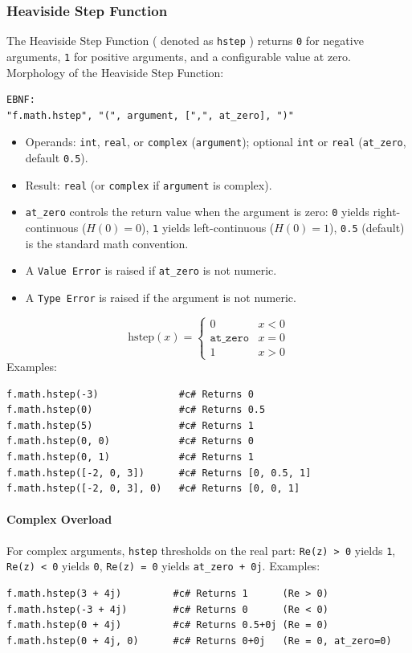 \subsubsection{Heaviside Step Function}
The Heaviside Step Function ( denoted as \texttt{hstep} ) returns \texttt{0} for negative arguments, \texttt{1} for positive arguments, and a configurable value at zero. \\
Morphology of the Heaviside Step Function:
\begin{verbatim}
EBNF:
"f.math.hstep", "(", argument, [",", at_zero], ")"
\end{verbatim}
\begin{itemize}
\item Operands: \texttt{int}, \texttt{real}, or \texttt{complex} (\texttt{argument}); optional \texttt{int} or \texttt{real} (\texttt{at\_zero}, default \texttt{0.5}).
\item Result: \texttt{real} (or \texttt{complex} if \texttt{argument} is complex).
\item \texttt{at\_zero} controls the return value when the argument is zero: \texttt{0} yields right-continuous ($H(0) = 0$), \texttt{1} yields left-continuous ($H(0) = 1$), \texttt{0.5} (default) is the standard math convention.
\item A \texttt{Value Error} is raised if \texttt{at\_zero} is not numeric.
\item A \texttt{Type Error} is raised if the argument is not numeric.
\end{itemize}
\[
\text{hstep}(x) = \begin{cases} 0 & x < 0 \\ \texttt{at\_zero} & x = 0 \\ 1 & x > 0 \end{cases}
\]
Examples:
\begin{verbatim}
f.math.hstep(-3)              #c# Returns 0
f.math.hstep(0)               #c# Returns 0.5
f.math.hstep(5)               #c# Returns 1
f.math.hstep(0, 0)            #c# Returns 0
f.math.hstep(0, 1)            #c# Returns 1
f.math.hstep([-2, 0, 3])      #c# Returns [0, 0.5, 1]
f.math.hstep([-2, 0, 3], 0)   #c# Returns [0, 0, 1]
\end{verbatim}

\paragraph{Complex Overload}
For complex arguments, \texttt{hstep} thresholds on the real part: \texttt{Re(z) > 0} yields \texttt{1}, \texttt{Re(z) < 0} yields \texttt{0}, \texttt{Re(z) = 0} yields \texttt{at\_zero + 0j}.
Examples:
\begin{verbatim}
f.math.hstep(3 + 4j)         #c# Returns 1      (Re > 0)
f.math.hstep(-3 + 4j)        #c# Returns 0      (Re < 0)
f.math.hstep(0 + 4j)         #c# Returns 0.5+0j (Re = 0)
f.math.hstep(0 + 4j, 0)      #c# Returns 0+0j   (Re = 0, at_zero=0)
\end{verbatim}


